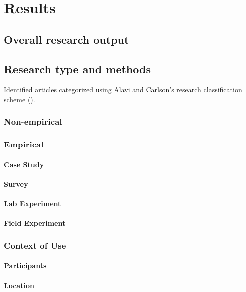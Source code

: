 \section{Results}

\subsection{Overall research output}


\subsection{Research type and methods}
Identified articles categorized using Alavi and Carlson's research classification scheme (\cite{alavi_review_1992}).

\subsubsection{Non-empirical}

\subsubsection{Empirical}
\paragraph{Case Study}
\paragraph{Survey}
\paragraph{Lab Experiment}
\paragraph{Field Experiment}

\subsubsection{Context of Use}
\paragraph{Participants}
\paragraph{Location}
